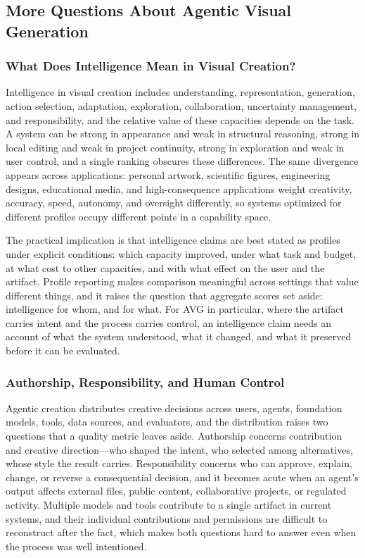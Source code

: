 \subsection{More Questions About Agentic Visual Generation}

\subsubsection{What Does Intelligence Mean in Visual Creation?}

Intelligence in visual creation includes understanding, representation, generation, action selection, adaptation, exploration, collaboration, uncertainty management, and responsibility, and the relative value of these capacities depends on the task. A system can be strong in appearance and weak in structural reasoning, strong in local editing and weak in project continuity, strong in exploration and weak in user control, and a single ranking obscures these differences. The same divergence appears across applications: personal artwork, scientific figures, engineering designs, educational media, and high-consequence applications weight creativity, accuracy, speed, autonomy, and oversight differently, so systems optimized for different profiles occupy different points in a capability space.

The practical implication is that intelligence claims are best stated as profiles under explicit conditions: which capacity improved, under what task and budget, at what cost to other capacities, and with what effect on the user and the artifact. Profile reporting makes comparison meaningful across settings that value different things, and it raises the question that aggregate scores set aside: intelligence for whom, and for what. For AVG in particular, where the artifact carries intent and the process carries control, an intelligence claim needs an account of what the system understood, what it changed, and what it preserved before it can be evaluated.

\subsubsection{Authorship, Responsibility, and Human Control}

Agentic creation distributes creative decisions across users, agents, foundation models, tools, data sources, and evaluators, and the distribution raises two questions that a quality metric leaves aside. Authorship concerns contribution and creative direction---who shaped the intent, who selected among alternatives, whose style the result carries. Responsibility concerns who can approve, explain, change, or reverse a consequential decision, and it becomes acute when an agent's output affects external files, public content, collaborative projects, or regulated activity. Multiple models and tools contribute to a single artifact in current systems, and their individual contributions and permissions are difficult to reconstruct after the fact, which makes both questions hard to answer even when the process was well intentioned.

